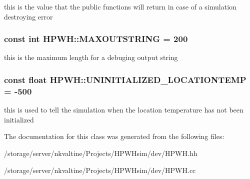 this is the value that the public functions will return in case of a simulation destroying error \hypertarget{class_h_p_w_h_aee834cec1de7483ecf642d310a7da75f}{
\subsubsection[{M\-A\-X\-O\-U\-T\-S\-T\-R\-I\-N\-G}]{\setlength{\rightskip}{0pt plus 5cm}const int H\-P\-W\-H\-::\-M\-A\-X\-O\-U\-T\-S\-T\-R\-I\-N\-G = 200\hspace{0.3cm}{\ttfamily [static]}}}\label{class_h_p_w_h_aee834cec1de7483ecf642d310a7da75f}
this is the maximum length for a debuging output string \hypertarget{class_h_p_w_h_aaa8fb3333f8cb5caf7ef0c92d3d8f998}{
\subsubsection[{U\-N\-I\-N\-I\-T\-I\-A\-L\-I\-Z\-E\-D\-\_\-\-L\-O\-C\-A\-T\-I\-O\-N\-T\-E\-M\-P}]{\setlength{\rightskip}{0pt plus 5cm}const float H\-P\-W\-H\-::\-U\-N\-I\-N\-I\-T\-I\-A\-L\-I\-Z\-E\-D\-\_\-\-L\-O\-C\-A\-T\-I\-O\-N\-T\-E\-M\-P = -\/500\hspace{0.3cm}{\ttfamily [static]}}}\label{class_h_p_w_h_aaa8fb3333f8cb5caf7ef0c92d3d8f998}
this is used to tell the simulation when the location temperature has not been initialized 

The documentation for this class was generated from the following files\-:\begin{DoxyCompactItemize}
\item 
/storage/server/nkvaltine/\-Projects/\-H\-P\-W\-Hsim/dev/H\-P\-W\-H.\-hh\item 
/storage/server/nkvaltine/\-Projects/\-H\-P\-W\-Hsim/dev/H\-P\-W\-H.\-cc\end{DoxyCompactItemize}
